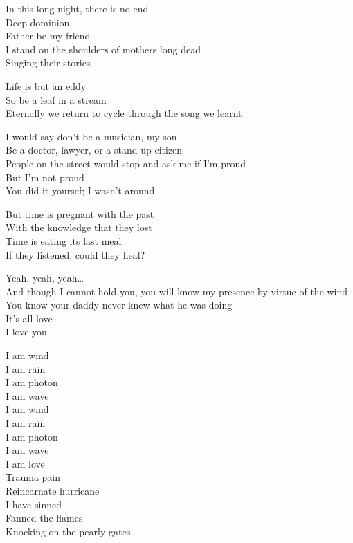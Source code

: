 
In this long night, there is no end\\
Deep dominion\\
Father be my friend\\
I stand on the shoulders of mothers long dead\\
Singing their stories\\


Life is but an eddy\\
So be a leaf in a stream\\
Eternally we return to cycle through the song we learnt\\


I would say don't be a musician, my son\\
Be a doctor, lawyer, or a stand up citizen\\
People on the street would stop and ask me if I'm proud\\
But I'm not proud\\
You did it yoursef; I wasn't around\\


But time is pregnant with the past\\
With the knowledge that they lost\\
Time is eating its last meal\\
If they listened, could they heal?\\


Yeah, yeah, yeah…\\
And though I cannot hold you, you will know my presence by virtue of the wind\\
You know your daddy never knew what he was doing\\
It's all love\\
I love you\\


I am wind\\
I am rain\\
I am photon\\
I am wave\\
I am wind\\
I am rain\\
I am photon\\
I am wave\\
I am love\\
Trauma pain\\
Reincarnate hurricane\\
I have sinned\\
Fanned the flames\\
Knocking on the pearly gates\\

